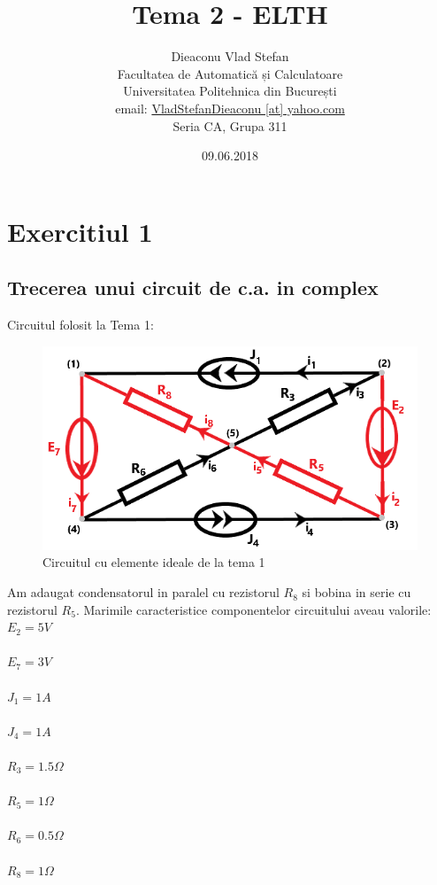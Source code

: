 \documentclass[12pt,titlepage,a4paper]{article}
\title{Tema 2 - ELTH }
\author{Dieaconu Vlad Stefan\\
        Facultatea de Automatică și Calculatoare\\
		Universitatea Politehnica din București\\
		email: \href{mailto:VladStefanDieaconu [at] yahoo.com}{VladStefanDieaconu [at] yahoo.com}\\
		Seria CA, Grupa 311}
\date{09.06.2018}
\begin{document}
\maketitle

\tableofcontents

\pagebreak
\section{Exercitiul 1}
\subsection{Trecerea unui circuit de c.a. in complex}
Circuitul folosit la Tema 1:

\begin{figure}[h!]
\begin{center} 
\hypertarget{C2}{}
\includegraphics[width=14cm]{schema1a.png}
\caption{Circuitul cu elemente ideale de la tema 1}\label{fig1a}
\end{center}
\end{figure}


\pagebreak

Am adaugat condensatorul in paralel cu rezistorul $R_{8}$ si bobina in serie cu rezistorul $R_5$. Marimile caracteristice componentelor circuitului aveau valorile: \\

$E_2 = 5V$\\\\
$E_7 = 3V$\\\\
$J_1 = 1A$\\\\
$J_4 = 1A$\\\\
$R_3 = 1.5\Omega$\\\\
$R_5 = 1\Omega$\\\\
$R_6 = 0.5\Omega$\\\\
$R_8 = 1\Omega$\\\\
\end{document}
